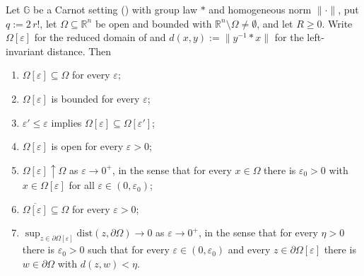 \begin{theorem}
Let $\mathbb G$ be a Carnot setting () with group law $*$ and
homogeneous norm $\|\cdot\|$, put $q:=2\,r!$, let $\Omega\subseteq\mathbb R^{n}$ be open and
bounded with $\mathbb R^{n}\setminus\Omega\neq\emptyset$, and let $R\ge0$. Write
$\Omega[\varepsilon]$ for the reduced domain of  and
$d(x,y):=\|y^{-1}*x\|$ for the left-invariant distance. Then
\begin{enumerate}
\item $\Omega[\varepsilon]\subseteq\Omega$ for every $\varepsilon$;
\item $\Omega[\varepsilon]$ is bounded for every $\varepsilon$;
\item $\varepsilon'\le\varepsilon$ implies
  $\Omega[\varepsilon]\subseteq\Omega[\varepsilon']$;
\item $\Omega[\varepsilon]$ is open for every $\varepsilon>0$;
\item $\Omega[\varepsilon]\uparrow\Omega$ as $\varepsilon\to0^{+}$, in the sense that for
  every $x\in\Omega$ there is $\varepsilon_0>0$ with $x\in\Omega[\varepsilon]$ for all
  $\varepsilon\in(0,\varepsilon_0)$;
\item $\overline{\Omega[\varepsilon]}\subseteq\Omega$ for every $\varepsilon>0$;
\item $\sup_{z\in\partial\Omega[\varepsilon]}\mathrm{dist}(z,\partial\Omega)\to0$ as
  $\varepsilon\to0^{+}$, in the sense that for every $\eta>0$ there is $\varepsilon_0>0$
  such that for every $\varepsilon\in(0,\varepsilon_0)$ and every
  $z\in\partial\Omega[\varepsilon]$ there is $w\in\partial\Omega$ with $d(z,w)<\eta$.
\end{enumerate}
\end{theorem}
